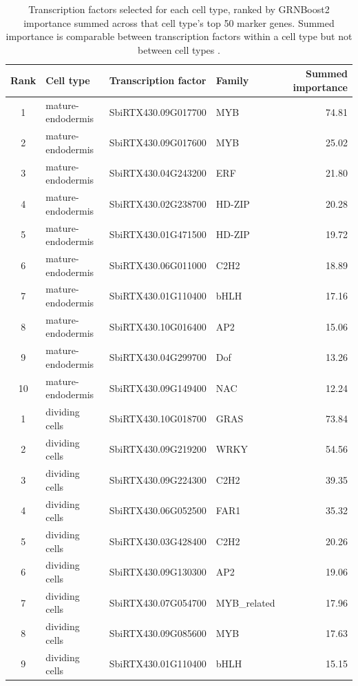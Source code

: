 \begin{table}[htbp]
\centering
\begin{singlespace}
\caption{Transcription factors selected for each cell type, ranked by GRNBoost2 importance summed across that cell type's top 50 marker genes. Summed importance is comparable between transcription factors within a cell type but not between cell types .}
\label{tab:tfs}
\small
\begin{tabular}{clll r}
\toprule
Rank & Cell type & Transcription factor & Family & Summed importance \\
\midrule
1  & mature-endodermis & SbiRTX430.09G017700 & MYB    & 74.81 \\
2  & mature-endodermis & SbiRTX430.09G017600 & MYB    & 25.02 \\
3  & mature-endodermis & SbiRTX430.04G243200 & ERF    & 21.80 \\
4  & mature-endodermis & SbiRTX430.02G238700 & HD-ZIP & 20.28 \\
5  & mature-endodermis & SbiRTX430.01G471500 & HD-ZIP & 19.72 \\
6  & mature-endodermis & SbiRTX430.06G011000 & C2H2   & 18.89 \\
7  & mature-endodermis & SbiRTX430.01G110400 & bHLH   & 17.16 \\
8  & mature-endodermis & SbiRTX430.10G016400 & AP2    & 15.06 \\
9  & mature-endodermis & SbiRTX430.04G299700 & Dof    & 13.26 \\
10 & mature-endodermis & SbiRTX430.09G149400 & NAC    & 12.24 \\
\midrule
1  & dividing cells & SbiRTX430.10G018700 & GRAS        & 73.84 \\
2  & dividing cells & SbiRTX430.09G219200 & WRKY        & 54.56 \\
3  & dividing cells & SbiRTX430.09G224300 & C2H2        & 39.35 \\
4  & dividing cells & SbiRTX430.06G052500 & FAR1        & 35.32 \\
5  & dividing cells & SbiRTX430.03G428400 & C2H2        & 20.26 \\
6  & dividing cells & SbiRTX430.09G130300 & AP2         & 19.06 \\
7  & dividing cells & SbiRTX430.07G054700 & MYB\_related & 17.96 \\
8  & dividing cells & SbiRTX430.09G085600 & MYB         & 17.63 \\
9  & dividing cells & SbiRTX430.01G110400 & bHLH        & 15.15 \\

\end{tabular}
\end{singlespace}
\end{table}
